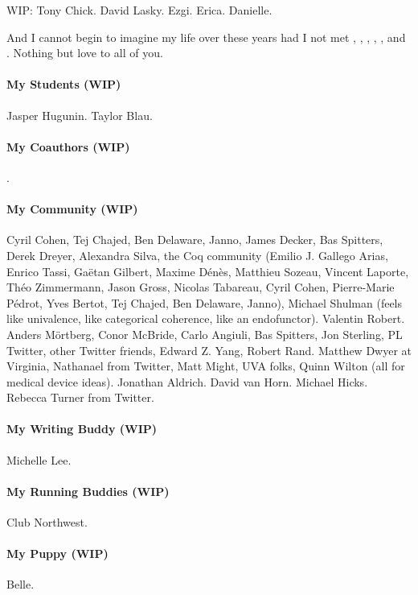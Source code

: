 \documentclass[ twoside,openright,titlepage,numbers=noenddot,headinclude,
                footinclude=true,cleardoublepage=empty,abstractoff,%
                BCOR=5mm,paper=letter,fontsize=11pt,letterpaper,%
                american,%
                ]{scrreprt}
\begin{document}
WIP: Tony Chick. David Lasky. Ezgi. Erica. Danielle.

And I cannot begin to imagine my life over these years had I not met
, , , , ,
and . %
Nothing but love to all of you.

\paragraph{My Students (WIP)}
Jasper Hugunin.
Taylor Blau.

\paragraph{My Coauthors (WIP)}
.

\paragraph{My Community (WIP)}
Cyril Cohen, Tej Chajed, Ben Delaware, Janno,
James Decker, Bas Spitters,
Derek Dreyer,
Alexandra Silva,
the Coq community (Emilio J. Gallego Arias, Enrico Tassi, Ga\"{e}tan Gilbert, Maxime D\'{e}n\`{e}s,
Matthieu Sozeau, Vincent Laporte, Th\'{e}o Zimmermann, Jason Gross, Nicolas Tabareau, Cyril Cohen, Pierre-Marie P\'{e}drot, Yves Bertot, Tej Chajed, Ben Delaware, Janno),
Michael Shulman (feels like univalence, like categorical coherence, like an endofunctor).
Valentin Robert.
Anders M\"ortberg, Conor McBride, Carlo Angiuli, Bas Spitters, Jon Sterling,
PL Twitter, other Twitter friends,
Edward Z. Yang, Robert Rand.
Matthew Dwyer at Virginia, Nathanael from Twitter, Matt Might, UVA folks, Quinn Wilton (all for medical device ideas).
Jonathan Aldrich.
David van Horn.
Michael Hicks. %
Rebecca Turner from Twitter.

\paragraph{My Writing Buddy (WIP)}
Michelle Lee.

\paragraph{My Running Buddies (WIP)}
Club Northwest.

\paragraph{My Puppy (WIP)}
Belle.
\end{document}
